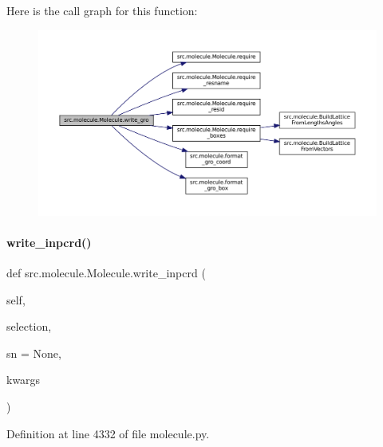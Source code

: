 Here is the call graph for this function\+:
\nopagebreak
\begin{figure}[H]
\begin{center}
\leavevmode
\includegraphics[width=350pt]{classsrc_1_1molecule_1_1Molecule_accdd08d1cdef8a51da59e1fc2268c7d8_cgraph}
\end{center}
\end{figure}
\mbox{\label{classsrc_1_1molecule_1_1Molecule_af975f93f5c43f518b84d0bd067c75604}} 
\paragraph{\texorpdfstring{write\+\_\+inpcrd()}{write\_inpcrd()}}
{\footnotesize\ttfamily def src.\+molecule.\+Molecule.\+write\+\_\+inpcrd (\begin{DoxyParamCaption}\item[{}]{self,  }\item[{}]{selection,  }\item[{}]{sn = {\ttfamily None},  }\item[{}]{kwargs }\end{DoxyParamCaption})}



Definition at line 4332 of file molecule.\+py.

